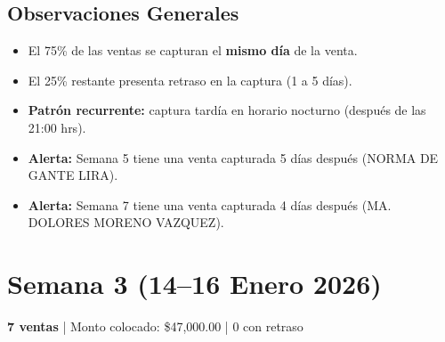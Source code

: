 \documentclass[11pt,a4paper]{article}
\begin{document}
\vspace{0.5cm}

\subsection*{\textcolor{headerblue}{Observaciones Generales}}
\begin{itemize}
    \item El 75\% de las ventas se capturan el \textbf{mismo d\'ia} de la venta.
    \item El 25\% restante presenta retraso en la captura (1 a 5 d\'ias).
    \item \textbf{Patr\'on recurrente:} captura tard\'ia en horario nocturno (despu\'es de las 21:00 hrs).
    \item \textcolor{alertred}{\textbf{Alerta:}} Semana 5 tiene una venta capturada 5 d\'ias despu\'es (NORMA DE GANTE LIRA).
    \item \textcolor{alertred}{\textbf{Alerta:}} Semana 7 tiene una venta capturada 4 d\'ias despu\'es (MA. DOLORES MORENO VAZQUEZ).
\end{itemize}

\newpage

\section*{\textcolor{headerblue}{Semana 3 (14--16 Enero 2026)}}
\textbf{7 ventas} | Monto colocado: \$47,000.00 | \textcolor{successgreen}{0 con retraso}
\end{document}
